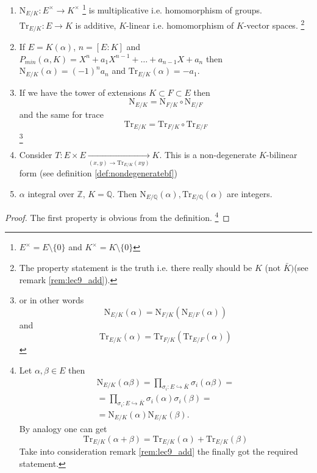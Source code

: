 \begin{property}
  \begin{enumerate}
  \item $\mathrm{N}_{E/K}: E^\times \to K^\times$
    \footnote{
      $E^\times = E \setminus \{0\}$ and
      $K^\times = K \setminus \{0\}$
    }
    is multiplicative
    i.e. homomorphism of groups.
    $\mathrm{Tr}_{E/K}: E \to K$ is additive, $K$-linear
    i.e. homomorphism of $K$-vector spaces.
    \footnote{
      The property statement is the truth i.e.
      there really should be $K$ (not $\bar{K})$(see remark
      \ref{rem:lec9_add}).
    }    
  \item If $E=K\left(\alpha\right)$, $n = \left[E:K\right]$ and
    $P_{min}\left(\alpha, K\right) = X^n + a_1 X^{n-1} + \dots +
    a_{n-1} X + a_{n}$ then $\mathrm{N}_{E/K}\left(\alpha\right) = (-1)^n
    a_n$ and $\mathrm{Tr}_{E/K}\left(\alpha\right) = -a_1$.
  \item If we have the tower of extensions $K \subset F \subset E$
    then
    \[
    \mathrm{N}_{E/K} =
    \mathrm{N}_{F/K} \circ
    \mathrm{N}_{E/F}
    \]
    and the same for trace
    \[
    \mathrm{Tr}_{E/K} =
    \mathrm{Tr}_{F/K} \circ
    \mathrm{Tr}_{E/F}
    \]
    \footnote{      
      or in other words
      \[
      \mathrm{N}_{E/K}\left(\alpha\right) =
      \mathrm{N}_{F/K} \left(
      \mathrm{N}_{E/F}\left(\alpha\right)
      \right)
      \]
      and
      \[
      \mathrm{Tr}_{E/K}\left(\alpha\right) =
      \mathrm{Tr}_{F/K} \left(
      \mathrm{Tr}_{E/F}\left(\alpha\right)
      \right)
      \]
    }
    \item Consider $T: E \times E \xrightarrow[(x, y) \to
      \mathrm{Tr}_{E/K}\left(xy\right)  ]{} K$. This is a
      non-degenerate $K$-bilinear form (see
      definition \ref{def:nondegeneratebf}) 
    \item $\alpha$ integral over $\mathbb{Z}$, $K = \mathbb{Q}$. Then
      $\mathrm{N}_{E/\mathbb{Q}}\left(\alpha\right),
      \mathrm{Tr}_{E/\mathbb{Q}}\left(\alpha\right)$ are integers.
  \end{enumerate}
  \begin{proof}
    The first property is obvious from the definition.
    \footnote{
      Let $\alpha, \beta \in E$ then
      \begin{eqnarray}
        \mathrm{N}_{E/K}\left(\alpha \beta\right) =
          \prod_{\sigma_i: E \hookrightarrow \bar{K}}
          \sigma_i\left(\alpha \beta\right) =
          \nonumber \\
          =
          \prod_{\sigma_i: E \hookrightarrow \bar{K}}
          \sigma_i\left(\alpha\right)
          \sigma_i\left(\beta\right) =
          \nonumber \\
          =
          \mathrm{N}_{E/K}\left(\alpha\right)
          \mathrm{N}_{E/K}\left(\beta\right).
        \nonumber
      \end{eqnarray}
      By analogy one can get
      \[
      \mathrm{Tr}_{E/K}\left(\alpha + \beta\right)=
      \mathrm{Tr}_{E/K}\left(\alpha\right) +
      \mathrm{Tr}_{E/K}\left(\beta\right)
      \]
      Take into consideration remark \ref{rem:lec9_add} the finally
      got the required statement.
    }


\end{proof}
\end{property}

